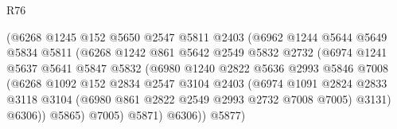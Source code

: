 \begin{lexlean}{R76}
\begin{coremodule}
                                  (@6268
                                    @1245
                                    @152
                                    @5650
                                    @2547
                                    @5811
                                    @2403
                                    (@6962
                                      @1244
                                      @5644
                                      @5649
                                      @5834
                                      @5811
                                      (@6268
                                        @1242
                                        @861
                                        @5642
                                        @2549
                                        @5832
                                        @2732
                                        (@6974
                                          @1241
                                          @5637
                                          @5641
                                          @5847
                                          @5832
                                          (@6980
                                            @1240
                                            @2822
                                            @5636
                                            @2993
                                            @5846
                                            @7008
                                            (@6268
                                              @1092
                                              @152
                                              @2834
                                              @2547
                                              @3104
                                              @2403
                                              (@6974
                                                @1091
                                                @2824
                                                @2833
                                                @3118
                                                @3104
                                                (@6980 @861 @2822 @2549 @2993 @2732 @7008 @7005)
                                                @3131)
                                              @6306))
                                          @5865)
                                        @7005)
                                      @5871)
                                    @6306))
                                @5877)

\end{coremodule}
\end{lexlean}
